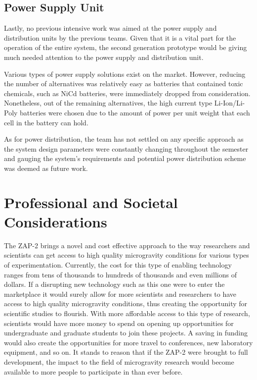 \subsection{Power Supply Unit}

\indent\indent Lastly, no previous intensive work was aimed at the power supply and distribution units by the previous teams. Given that it is a vital part for the operation of the entire system, the second generation prototype would be giving much needed attention to the power supply and distribution unit.

\indent Various types of power supply solutions exist on the market. However, reducing the number of alternatives was relatively easy as batteries that contained toxic chemicals, such as NiCd batteries, were immediately dropped from consideration. Nonetheless, out of the remaining alternatives, the high current type Li-Ion/Li-Poly batteries were chosen due to the amount of power per unit weight that each cell in the battery can hold.

\indent As for power distribution, the team has not settled on any specific approach as the system design parameters were constantly changing throughout the semester and gauging the system’s requirements and potential power distribution scheme was deemed as future work.


\section{Professional and Societal Considerations}

\indent\indent The ZAP-2 brings a novel and cost effective approach to the way researchers and scientists can get access to high quality microgravity conditions for various types of experimentation. Currently, the cost for this type of enabling technology ranges from tens of thousands to hundreds of thousands and even millions of dollars. If a disrupting new technology such as this one were to enter the marketplace it would surely allow for more scientists and researchers to have access to high quality microgravity conditions, thus creating the opportunity for scientific studies to flourish. With more affordable access to this type of research, scientists would have more money to spend on opening up opportunities for undergraduate and graduate students to join these projects. A saving in funding would also create the opportunities for more travel to conferences, new laboratory equipment, and so on. It stands to reason that if the ZAP-2 were brought to full development, the impact to the field of microgravity research would become available to more people to participate in than ever before.

